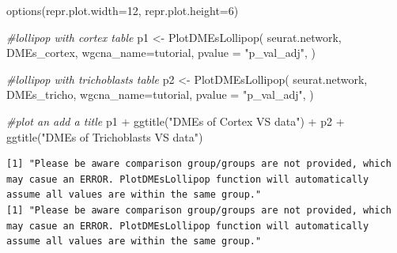 \documentclass[
  letterpaper,
  DIV=11,
  numbers=noendperiod]{scrartcl}
\newenvironment{Shaded}{}{}
\newcommand{\AttributeTok}[1]{\textcolor[rgb]{0.49,0.56,0.16}{#1}}
\newcommand{\CommentTok}[1]{\textcolor[rgb]{0.38,0.63,0.69}{\textit{#1}}}
\newcommand{\DecValTok}[1]{\textcolor[rgb]{0.25,0.63,0.44}{#1}}
\newcommand{\FunctionTok}[1]{\textcolor[rgb]{0.02,0.16,0.49}{#1}}
\newcommand{\NormalTok}[1]{#1}
\newcommand{\OtherTok}[1]{\textcolor[rgb]{0.00,0.44,0.13}{#1}}
\newcommand{\SpecialCharTok}[1]{\textcolor[rgb]{0.25,0.44,0.63}{#1}}
\newcommand{\StringTok}[1]{\textcolor[rgb]{0.25,0.44,0.63}{#1}}
\begin{document}
\begin{Shaded}
\begin{Highlighting}[]
\FunctionTok{options}\NormalTok{(}\AttributeTok{repr.plot.width=}\DecValTok{12}\NormalTok{, }\AttributeTok{repr.plot.height=}\DecValTok{6}\NormalTok{)}

\CommentTok{\#lollipop with cortex table}
\NormalTok{p1 }\OtherTok{\textless{}{-}} \FunctionTok{PlotDMEsLollipop}\NormalTok{(}
\NormalTok{  seurat.network, }
\NormalTok{  DMEs\_cortex, }
  \AttributeTok{wgcna\_name=}\StringTok{\textquotesingle{}tutorial\textquotesingle{}}\NormalTok{, }
  \AttributeTok{pvalue =} \StringTok{"p\_val\_adj"}\NormalTok{,}
\NormalTok{)}

\CommentTok{\#lollipop with trichoblasts table}
\NormalTok{p2 }\OtherTok{\textless{}{-}} \FunctionTok{PlotDMEsLollipop}\NormalTok{(}
\NormalTok{  seurat.network, }
\NormalTok{  DMEs\_tricho, }
  \AttributeTok{wgcna\_name=}\StringTok{\textquotesingle{}tutorial\textquotesingle{}}\NormalTok{, }
  \AttributeTok{pvalue =} \StringTok{"p\_val\_adj"}\NormalTok{,}
\NormalTok{)}

\CommentTok{\#plot an add a title}
\NormalTok{p1 }\SpecialCharTok{+} \FunctionTok{ggtitle}\NormalTok{(}\StringTok{"DMEs of Cortex VS data"}\NormalTok{) }\SpecialCharTok{+} 
\NormalTok{p2 }\SpecialCharTok{+} \FunctionTok{ggtitle}\NormalTok{(}\StringTok{"DMEs of Trichoblasts VS data"}\NormalTok{)}
\end{Highlighting}
\end{Shaded}

\begin{verbatim}
[1] "Please be aware comparison group/groups are not provided, which may casue an ERROR. PlotDMEsLollipop function will automatically assume all values are within the same group."
[1] "Please be aware comparison group/groups are not provided, which may casue an ERROR. PlotDMEsLollipop function will automatically assume all values are within the same group."
\end{verbatim}
\end{document}
